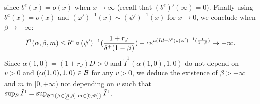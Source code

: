 \documentclass{svjour3}
\begin{document}
since  $b^e(x)=o(x)$   when $x\to\infty$ (recall that $(b^e)'(\infty)=0$). Finally
using   $b^a(x)=o(x)$ and $(\varphi')^{-1}(x) \sim (\psi')^{-1}(x) $ for $x \rightarrow 0$, we conclude when $\beta\to -\infty$:  
$$ \tilde I^1(\alpha,\beta,m)
\leq b^a\circ(\psi')^{-1}(\frac{1+r_J}{\delta^+(1-\beta)})   -c   e^{u(Id-b^e\\)\circ(\varphi')^{-1}(\frac{1}{1-\beta})}  \\
\to-\infty.$$
Since $\alpha(1,0)=(1+r_J)D>0$ and $\tilde I^1(\alpha(1,0),1,0)$ do not depend on $v>0$ and $(\alpha(1,0),1,0)\in{\cal B}$ for any $v>0$, 
we deduce the existence of $\underline{\beta}>-\infty$ and $\bar{m}$ in $[0,+\infty)$ not depending on $v$ such that $\sup_{\cal B}\tilde I^1=\sup_{{\cal B}\cap\{\beta\in[\underline{\beta},\bar\beta],m\in[0,\bar{m}]\}}\tilde I^1$. 
\end{document}
